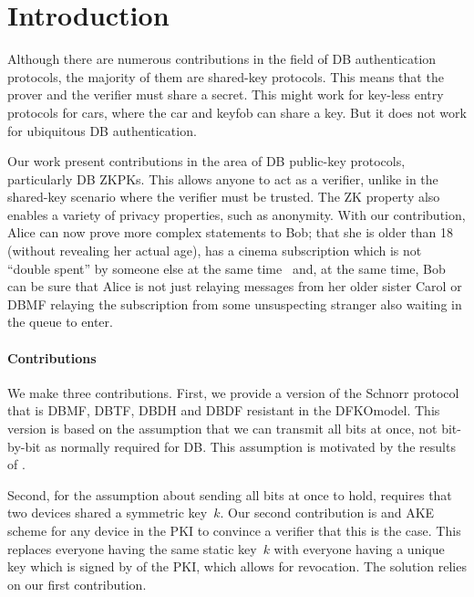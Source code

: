 \section{Introduction}%
\label{Introduction}

Although there are numerous contributions in the field of \ac{DB} 
authentication protocols, the majority of them are shared-key protocols.
This means that the prover and the verifier must share a secret.
This might work for key-less entry protocols for cars, where the car and keyfob 
can share a key.
But it does not work for ubiquitous \ac{DB} authentication.

Our work present contributions in the area of \ac{DB} public-key protocols, 
particularly \ac{DB} \acp{ZKPK}.
This allows anyone to act as a verifier, unlike in the shared-key scenario 
where the verifier must be trusted.
The \ac{ZK} property also enables a variety of privacy properties, such as 
anonymity.
With our contribution, Alice can
now prove more complex statements to Bob; \eg that she is older than 18 
(without revealing her actual age), has a cinema subscription which is not 
\enquote{double spent} by someone else at the same time~\cite[\eg][]{AnonPass} 
and, at the same time, Bob can be sure that Alice is not just relaying messages 
from her older sister Carol or \ac{DBMF} relaying the subscription from some 
unsuspecting stranger also waiting in the queue to enter.


\paragraph*{Contributions}

We make three contributions.
First, we provide a version of the Schnorr protocol that is \ac{DBMF}, 
\ac{DBTF}, \ac{DBDH} and \ac{DBDF} resistant in the \ac{DFKOmodel}.
This version is based on the assumption that we can transmit all bits at once, 
not bit-by-bit as normally required for \ac{DB}.
This assumption is motivated by the results of \textcite{UWBPR}.

Second, for the assumption about sending all bits at once to hold, 
\textcite{UWBPR} requires that two devices shared a symmetric key~\(k\).
Our second contribution is  and \ac{AKE} scheme for any device in 
the \ac{PKI} to convince a verifier that this is the case.
This replaces everyone having the same static key~\(k\) with everyone having a 
unique key which is signed by  of the \ac{PKI}, which allows for 
revocation.
The solution relies on our first contribution.

